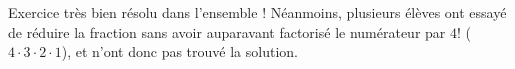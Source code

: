 Exercice très bien résolu dans l'ensemble !
Néanmoins, plusieurs élèves ont essayé de réduire la fraction sans avoir auparavant factorisé le numérateur par $4!$ ($4\cdot 3\cdot 2\cdot 1$), et n'ont donc pas trouvé la solution.